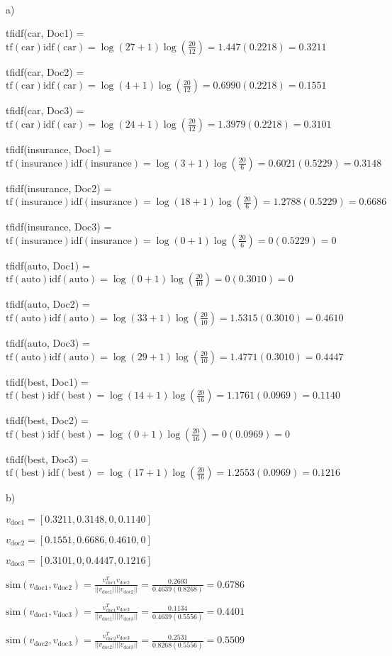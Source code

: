 \begin{solution} \ \\
a) 

tfidf(car, Doc1) = $\text{tf}(\text{car})\text{idf}(\text{car}) = \log(27 + 1)\log(\frac{20}{12}) = 1.447(0.2218) = 0.3211$

tfidf(car, Doc2) = $\text{tf}(\text{car})\text{idf}(\text{car}) = \log(4 + 1)\log(\frac{20}{12}) = 0.6990(0.2218) = 0.1551$

tfidf(car, Doc3) = $\text{tf}(\text{car})\text{idf}(\text{car}) = \log(24 + 1)\log(\frac{20}{12}) = 1.3979(0.2218) = 0.3101$

\small tfidf(insurance, Doc1) = $\text{tf}(\text{insurance})\text{idf}(\text{insurance}) = \log(3 + 1)\log(\frac{20}{6}) = 0.6021(0.5229) = 0.3148$

\small tfidf(insurance, Doc2) = $\text{tf}(\text{insurance})\text{idf}(\text{insurance}) = \log(18 + 1)\log(\frac{20}{6}) = 1.2788(0.5229) = 0.6686$

\small tfidf(insurance, Doc3) = $\text{tf}(\text{insurance})\text{idf}(\text{insurance}) = \log(0 + 1)\log(\frac{20}{6}) = 0(0.5229) = 0$

\normalsize tfidf(auto, Doc1) = $\text{tf}(\text{auto})\text{idf}(\text{auto}) = \log(0 + 1)\log(\frac{20}{10}) = 0(0.3010) = 0$

tfidf(auto, Doc2) = $\text{tf}(\text{auto})\text{idf}(\text{auto}) = \log(33 + 1)\log(\frac{20}{10}) = 1.5315(0.3010) = 0.4610$

tfidf(auto, Doc3) = $\text{tf}(\text{auto})\text{idf}(\text{auto}) = \log(29 + 1)\log(\frac{20}{10}) = 1.4771(0.3010) = 0.4447$

tfidf(best, Doc1) = $\text{tf}(\text{best})\text{idf}(\text{best}) = \log(14 + 1)\log(\frac{20}{16}) = 1.1761(0.0969) = 0.1140$

tfidf(best, Doc2) = $\text{tf}(\text{best})\text{idf}(\text{best}) = \log(0 + 1)\log(\frac{20}{16}) = 0(0.0969) = 0$

tfidf(best, Doc3) = $\text{tf}(\text{best})\text{idf}(\text{best}) = \log(17 + 1)\log(\frac{20}{16}) = 1.2553(0.0969) = 0.1216$

b)

$v_{\text{doc1}} = [0.3211, 0.3148, 0, 0.1140]$

$v_{\text{doc2}} = [0.1551, 0.6686, 0.4610, 0]$

$v_{\text{doc3}} = [0.3101, 0, 0.4447, 0.1216]$

$\text{sim}(v_{\text{doc1}}, v_{\text{doc2}}) = \frac{v_{\text{doc1}}^Tv_{\text{doc2}}}{\vert\vert v_{\text{doc1}} \vert\vert\vert\vert v_{\text{doc2}} \vert\vert} = \frac{0.2603}{0.4639(0.8268)} = 0.6786$

$\text{sim}(v_{\text{doc1}}, v_{\text{doc3}}) = \frac{v_{\text{doc1}}^Tv_{\text{doc3}}}{\vert\vert v_{\text{doc1}} \vert\vert\vert\vert v_{\text{doc3}} \vert\vert} = \frac{0.1134}{0.4639(0.5556)} = 0.4401$

$\text{sim}(v_{\text{doc2}}, v_{\text{doc3}}) = \frac{v_{\text{doc2}}^Tv_{\text{doc3}}}{\vert\vert v_{\text{doc2}} \vert\vert\vert\vert v_{\text{doc3}} \vert\vert} = \frac{0.2531}{0.8268(0.5556)} = 0.5509$
\end{solution}
